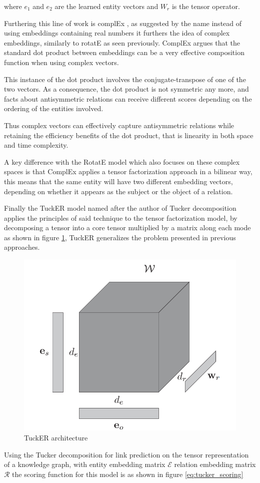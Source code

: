 where $e_1$ and $e_2$ are the learned entity vectors and $W_r$ is the tensor operator. 

Furthering this line of work is complEx \cite{}, as suggested by the name instead of using embeddings containing real numbers it furthers the idea of complex embeddings, similarly to rotatE as seen previously. ComplEx argues that the standard dot product between embeddings can be a very effective composition function when using complex vectors.

This instance of the dot product involves the conjugate-transpose of one of the two vectors. As a consequence, the dot product is not symmetric any more, and facts about antisymmetric relations can receive different scores depending on the ordering of the entities involved.

Thus complex vectors can effectively capture antisymmetric relations while retaining the efficiency benefits of the dot product, that is linearity in both space and time complexity.

A key difference with the RotatE model which also focuses on these complex spaces is that ComplEx applies a tensor factorization approach in a bilinear way, this means that the same entity will have two different embedding vectors, depending on whether it appears as the subject or the object of a relation.

Finally the TuckER \cite{} model named after the author of Tucker decomposition \cite{} applies the principles of said technique to the tensor factorization model, by decomposing a tensor into a core tensor multiplied by a matrix along each mode as shown in figure \ref{fig:emb-tucker}, TuckER generalizes the problem presented in previous approaches.

\begin{figure}[!ht]
    \centering
    \includegraphics[width=.45\textwidth]{fig/embeddings/TuckER.png}
    \caption{TuckER architecture}
    \label{fig:emb-tucker}
\end{figure}

Using the Tucker decomposition for link prediction on the tensor representation of a knowledge graph, with entity embedding matrix $\mathcal{E}$ relation embedding matrix $\mathcal{R}$ the scoring function for this model is as shown in figure \ref{eq:tucker_scoring}

